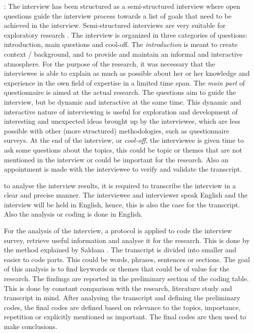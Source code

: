 : The interview has been structured as a semi-structured interview where open questions guide the interview process towards a list of goals that need to be achieved in the interview. Semi-structured interviews are very suitable for exploratory research \cite{Runeson:2009:GCR:1519313.1519324}. The interview is organized in three categories of questions: introduction, main questions and cool-off.
The {\em introduction} is meant to create context / background, and to provide and maintain an informal and interactive atmosphere. For the purpose of the research, it was necessary that the interviewee is able to explain as much as possible about her or her knowledge and experience in the own field of expertise in a limited time span. 
The {\em main part} of questionnaire is aimed at the actual research. The questions aim to guide the interview, but be dynamic and interactive at the same time. This dynamic and interactive nature of interviewing is useful for exploration and development of interesting and unexpected ideas brought up by the interviewee, which are less possible with other (more structured) methodologies, such as questionnaire surveys.
At the end of the interview, or {\em cool-off}, the interviewee is given time to ask some questions about the topics, this could be topic or themes that are not mentioned in the interview or could be important for the research. Also an appointment is made with the interviewee to verify and validate the transcript.

 to analyse the interview results, it is required to transcribe the interview in a clear and precise manner. The interviewee and interviewer speak English and the interview will be held in English, hence, this is also the case for the transcript. Also the analysis or coding is done in English.

 For the analysis of the interview, a protocol is applied to code the interview survey, retrieve useful information and analyse it for the research. This is done by the method explained by Saldana \cite{saldana2015coding}. The transcript is divided into smaller and easier to code parts. This could be words, phrases, sentences or sections. The goal of this analysis is to find keywords or themes that could be of value for the research. The findings are reported in the preliminary section of the coding table. This is done by constant comparison with the research, literature study and transcript in mind. After analysing the transcript and defining the preliminary codes, the final codes are defined based on relevance to the topics, importance, repetition or explicitly mentioned as important. The final codes are then used to make conclusions.

